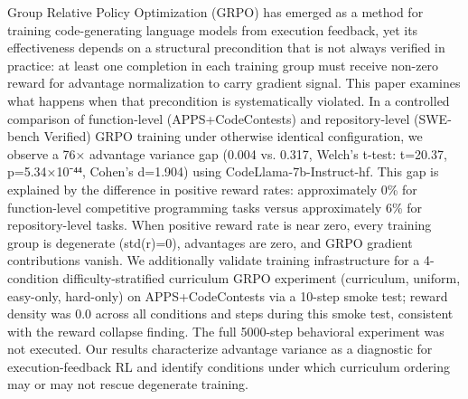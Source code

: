 
Group Relative Policy Optimization (GRPO) has emerged as a method for training code-generating language models from execution feedback, yet its effectiveness depends on a structural precondition that is not always verified in practice: at least one completion in each training group must receive non-zero reward for advantage normalization to carry gradient signal. This paper examines what happens when that precondition is systematically violated. In a controlled comparison of function-level (APPS+CodeContests) and repository-level (SWE-bench Verified) GRPO training under otherwise identical configuration, we observe a 76× advantage variance gap (0.004 vs. 0.317, Welch's t-test: t=20.37, p=5.34×10⁻⁴⁴, Cohen's d=1.904) using CodeLlama-7b-Instruct-hf. This gap is explained by the difference in positive reward rates: approximately 0\% for function-level competitive programming tasks versus approximately 6\% for repository-level tasks. When positive reward rate is near zero, every training group is degenerate (std(r)=0), advantages are zero, and GRPO gradient contributions vanish. We additionally validate training infrastructure for a 4-condition difficulty-stratified curriculum GRPO experiment (curriculum, uniform, easy-only, hard-only) on APPS+CodeContests via a 10-step smoke test; reward density was 0.0 across all conditions and steps during this smoke test, consistent with the reward collapse finding. The full 5000-step behavioral experiment was not executed. Our results characterize advantage variance as a diagnostic for execution-feedback RL and identify conditions under which curriculum ordering may or may not rescue degenerate training.
